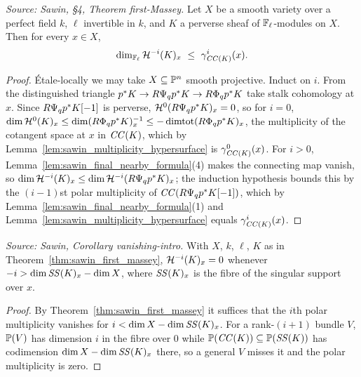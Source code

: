 \begin{theorem}
  \label{thm:sawin_first_massey}
  \textit{Source: Sawin, §4, Theorem first-Massey.}
  Let $X$ be a smooth variety over a perfect field $k$, $\ell$ invertible in $k$,
  and $K$ a perverse sheaf of $\mathbb{F}_\ell$-modules on $X$.  Then for every $x\in X$,
  \[ \dim_{\bF_\ell}\cH^{-i}(K)_x \ \le\ \gamma^i_{\CCyc(K)}(x). \]
\end{theorem}
\begin{proof}
  Étale-locally we may take $X\subseteq\mathbb{P}^n$ smooth projective.  Induct on $i$.
  From the distinguished triangle $p^*K\to R\Psi_q p^*K\to R\Phi_q p^*K$ take stalk
  cohomology at $x$.  Since $R\Psi_q p^*K[-1]$ is perverse, $\mathcal{H}^0(R\Psi_q p^*K)_x=0$,
  so for $i=0$, $\dim\mathcal{H}^0(K)_x\le\dim(R\Phi_q p^*K)^{-1}_x\le-\operatorname{dimtot}(R\Phi_q
  p^*K)_x$, the multiplicity of the cotangent space at $x$ in $\mathit{CC}(K)$, which by
  Lemma~\ref{lem:sawin_multiplicity_hypersurface} is $\gamma^0_{\mathit{CC}(K)}(x)$.
  For $i>0$, Lemma~\ref{lem:sawin_final_nearby_formula}(4) makes the connecting map
  vanish, so $\dim\mathcal{H}^{-i}(K)_x\le\dim\mathcal{H}^{-i}(R\Psi_q p^*K)_x$; the induction
  hypothesis bounds this by the $(i-1)$st polar multiplicity of
  $\mathit{CC}(R\Psi_q p^*K[-1])$, which by
  Lemma~\ref{lem:sawin_final_nearby_formula}(1) and
  Lemma~\ref{lem:sawin_multiplicity_hypersurface} equals $\gamma^i_{\mathit{CC}(K)}(x)$.
\end{proof}

\begin{corollary}
  \label{cor:sawin_vanishing}
  \textit{Source: Sawin, Corollary vanishing-intro.}
  With $X$, $k$, $\ell$, $K$ as in Theorem~\ref{thm:sawin_first_massey},
  $\mathcal{H}^{-i}(K)_x = 0$ whenever $-i > \dim\mathit{SS}(K)_x - \dim X$, where
  $\mathit{SS}(K)_x$ is the fibre of the singular support over $x$.
\end{corollary}
\begin{proof}
  By Theorem~\ref{thm:sawin_first_massey} it suffices that the $i$th polar
  multiplicity vanishes for $i<\dim X-\dim\mathit{SS}(K)_x$.  For a rank-$(i+1)$ bundle
  $V$, $\mathbb{P}(V)$ has dimension $i$ in the fibre over $0$ while $\mathbb{P}(\mathit{CC}(K))
  \subseteq\mathbb{P}(\mathit{SS}(K))$ has codimension $\dim X-\dim\mathit{SS}(K)_x$ there, so a
  general $V$ misses it and the polar multiplicity is zero.
\end{proof}
